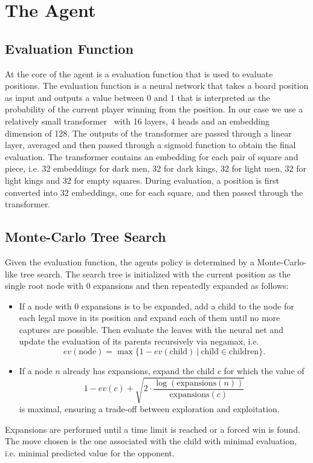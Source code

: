 \documentclass[a4paper,12pt]{article}
\theoremstyle{definition}
\theoremstyle{definition}
\theoremstyle{definition}
\theoremstyle{definition}
\theoremstyle{definition}
\theoremstyle{definition}
\begin{document}
	\section{The Agent}
	
	\subsection{Evaluation Function}

	At the core of the agent is a evaluation function that is used to evaluate positions. The evaluation function is a neural network that takes a board position as input and outputs a value between $0$ and $1$ that is interpreted as the probability of the current player winning from the position. In our case we use a relatively small transformer~\cite{viswanathan2017attention} with 16 layers, 4 heads and an embedding dimension of 128. The outputs of the transformer are passed through a linear layer, averaged and then passed through a sigmoid function to obtain the final evaluation. The transformer contains an embedding for each pair of square and piece, i.e. 32 embeddings for dark men, 32 for dark kings, 32 for light men, 32 for light kings and 32 for empty squares. During evaluation, a position is first converted into 32 embeddings, one for each square, and then passed through the transformer.

	\subsection{Monte-Carlo Tree Search}

	Given the evaluation function, the agents policy is determined by a Monte-Carlo-like tree search. The search tree is initialized with the current position as the single root node with $0$ expansions and then repeatedly expanded as follows:
	\begin{itemize}
		\item If a node with $0$ expansions is to be expanded, add a child to the node for each legal move in its position and expand each of them until no more captures are possible. Then evaluate the leaves with the neural net and update the evaluation of its parents recursively via negamax, i.e. 
		$$ev(\text{node}) = \max\{1 - ev(\text{child})\:|\:\text{child}\in\text{children}\}.$$
		\item If a node $n$ already has expansions, expand the child $c$ for which the value of
		$$1-ev(c) + \sqrt{2\cdot\frac{\log(\text{expansions}(n))}{\text{expansions}(c)}}$$
		is maximal, ensuring a trade-off between exploration and exploitation.
	\end{itemize}
	Expansions are performed until a time limit is reached or a forced win is found. The move chosen is the one associated with the child with minimal evaluation, i.e. minimal predicted value for the opponent.
\end{document}
